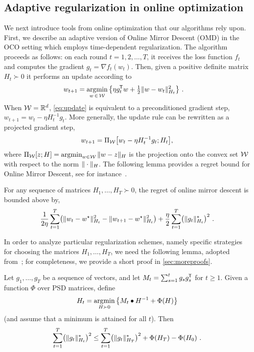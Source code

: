 \subsection{Adaptive regularization in online optimization}
We next introduce tools from online optimization that our algorithms
rely upon. First, we describe an adaptive version of Online Mirror
Descent (OMD) in the OCO setting which employs time-dependent
regularization. The algorithm proceeds as follows: on each
round $t=1,2,\ldots,T$, it receives the loss function $f_t$ and computes the
gradient $g_t = \nabla f_t(w_t)$. Then, given a positive definite
matrix $H_t \succ 0$ it performs an update according to
\begin{align} \label{eq:update}
w_{t+1} &=
\argmin_{w \,\in\, \cW} \, \Lrset{ \eta g_t \tr w
	+ \thalf\norm{w - w_t}_{H_t}^2 } ~ .
\end{align}
When $\mathcal{W} = \mathbb{R}^d$, \cref{eq:update} is equivalent to a preconditioned gradient step, $w_{t+1} = w_t - \eta H_t^{-1} g_t .$
More generally, the update rule can be rewritten as a projected gradient step,
\begin{align*}
w_{t+1} = \Pi_{\mathcal{W}} \mathopen{}\big[ w_t - \eta H_t^{-1} g_t ; H_t \big] ,
\end{align*}
where $\Pi_{\mathcal{W}}[z ; H] = \operatorname*{arg\!\min}_{w \in \mathcal{W}} \|w-z\|_{H}$ is the
projection onto the convex set $\mathcal{W}$ with respect to the norm
$\|\cdot\|_{H}$.  
The following lemma provides a regret bound for Online
Mirror Descent, see for instance~\cite{duchi2011adaptive}.

\begin{lemma} \label{lem:regret-md}
For any sequence of matrices $H_1,\ldots,H_T \succ 0$, the regret of online
mirror descent is bounded above by,
$$
	\frac{1}{2\eta} \sum_{t=1}^T \mathopen{}\big( \|w_t-w^\star\|_{H_t}^2 - \|w_{t+1}-w^\star\|_{H_t}^2 \big)
	+
	\frac{\eta}{2} \sum_{t=1}^T \mathopen{}\big(\|g_t\|_{H_t}^*\big)^2 ~ .
$$
\end{lemma}

In order to analyze particular regularization schemes, namely specific
strategies for choosing the matrices $H_1,\ldots,H_T$, we need the following
lemma, adopted from~\cite{gupta2017unified}; for completeness, we provide a short proof in \cref{sec:moreproofs}. 

\begin{lemma} \label{lem:adareg}
Let $g_1,\ldots,g_T$ be a sequence of vectors, and let
$M_t = \sum_{s=1}^t g_s g_s^{\mkern-1.5mu\scriptstyle\mathsf{T}}$ for $t \geq 1$.
Given a function $\Phi$ over PSD matrices, define
\begin{align*}
H_t = \operatorname*{arg\!\min}_{H \succ 0} \, \mathopen{}\big\{ M_t \bullet H^{-1} + \Phi(H) \big\}
\end{align*}
(and assume that a minimum is attained for all $t$).
Then
\begin{align*}
	\sum_{t=1}^T \mathopen{}\big(\|g_t\|_{H_t}^*\big)^2 \le
		\sum_{t=1}^T \mathopen{}\big(\|g_t\|_{H_T}^*\big)^2 + \Phi(H_T) - \Phi(H_0) ~ .
\end{align*}
\end{lemma}




